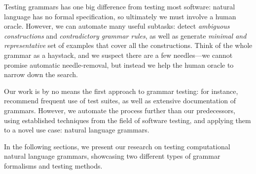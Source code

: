 


Testing grammars has one big difference from testing most software: natural
language has no formal specification, so ultimately we must involve a
human oracle. However, we can automate many useful subtasks: detect
\emph{ambiguous constructions} and \emph{contradictory grammar rules},
as well as generate \emph{minimal and representative} set of examples
that cover all the constructions. Think of the whole grammar as a
haystack, and we suspect there are a few needles---we cannot promise
automatic needle-removal, but instead we help the human oracle to
narrow down the search.

Our work is by no means the first approach to grammar testing: for instance, \citet{butt1999lfg} recommend frequent use of test suites, as well as extensive documentation of grammars. However, we automate the process further than our predecessors, using established techniques from the field of software testing, and applying them to a novel use case: natural language grammars.

In the following sections, we present our research on testing
computational natural language grammars, showcasing two different
types of grammar formalisms and testing methods.

